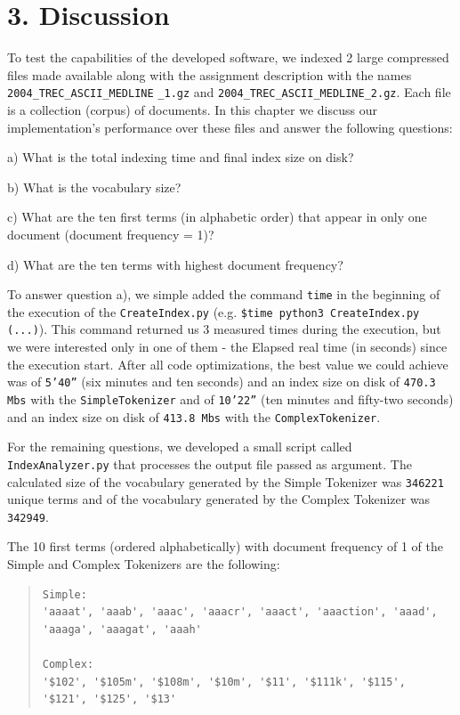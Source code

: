 \documentclass[12pt]{article}
\begin{document}
\newpage
\section*{3. Discussion}

To test the capabilities of the developed software, we indexed 2 large 
compressed files made available along with the assignment description
with the names \texttt{2004\_TREC\_ASCII\_MEDLINE} \texttt{\_1.gz} and 
\texttt{2004\_TREC\_ASCII\_MEDLINE\_2.gz}.
Each file is a collection (corpus) of documents.
In this chapter we discuss our implementation's performance over these 
files and answer the following questions:

a) What is the total indexing time and final index size on disk?

b) What is the vocabulary size?

c) What are the ten first terms (in alphabetic order) that appear in 
only one document (document frequency = 1)?

d) What are the ten terms with highest document frequency?

To answer question a), we simple added the command \texttt{time} in the
beginning of the execution of the \texttt{CreateIndex.py} 
(e.g. \texttt{\$time python3 CreateIndex.py (...)}).
This command returned us 3 measured times during the execution, but we 
were interested only in one of them - the Elapsed real time (in seconds)
since the execution start.
After all code optimizations, the best value we could achieve was of 
\texttt{5'40''} (six minutes and ten seconds) and an index size on 
disk of \texttt{470.3 Mbs} with the \texttt{SimpleTokenizer} and of 
\texttt{10'22''} (ten minutes and fifty-two seconds) and an index 
size on disk of \texttt{413.8 Mbs} with the \texttt{ComplexTokenizer}.

For the remaining questions, we developed a small script called
\texttt{IndexAnalyzer.py} that processes the output file passed as argument.
The calculated size of the vocabulary generated by the Simple Tokenizer
was \texttt{346221} unique terms and of the vocabulary generated by the 
Complex Tokenizer was \texttt{342949}.

The 10 first terms (ordered alphabetically) with document frequency of 1 
of the Simple and Complex Tokenizers are the following:

\begingroup
\addtolength\leftmargini{-0.4in}
\addtolength\baselineskip{-0.05in}
\begin{quote}
\begin{verbatim}
Simple:
'aaaat', 'aaab', 'aaac', 'aaacr', 'aaact', 'aaaction', 'aaad', 
'aaaga', 'aaagat', 'aaah'

Complex:
'$102', '$105m', '$108m', '$10m', '$11', '$111k', '$115',
'$121', '$125', '$13'
\end{verbatim}
\end{quote}
\endgroup
\end{document}
